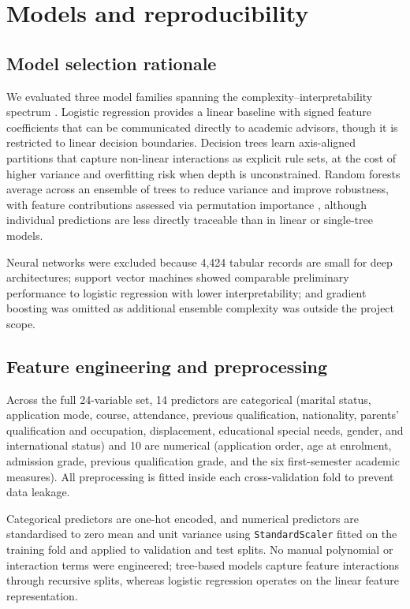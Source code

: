 \documentclass[11pt,a4paper]{article}
\begin{document}
\section{Models and reproducibility}

\subsection{Model selection rationale}

We evaluated three model families spanning the complexity--interpretability spectrum
\citep{hastie2009}. Logistic regression provides a linear baseline with signed feature coefficients
that can be communicated directly to academic advisors, though it is restricted to linear decision
boundaries. Decision trees learn axis-aligned partitions that capture non-linear interactions as
explicit rule sets, at the cost of higher variance and overfitting risk when depth is unconstrained.
Random forests \citep{breiman2001} average across an ensemble of trees to reduce variance and
improve robustness, with feature contributions assessed via permutation importance
\citep{strobl2008}, although individual predictions are less directly traceable than in linear or
single-tree models.

Neural networks were excluded because 4,424 tabular records are small for deep architectures;
support vector machines showed comparable preliminary performance to logistic regression with lower
interpretability; and gradient boosting was omitted as additional ensemble complexity was outside
the project scope.

\subsection{Feature engineering and preprocessing}

Across the full 24-variable set, 14 predictors are categorical (marital status, application mode,
course, attendance, previous qualification, nationality, parents' qualification and occupation,
displacement, educational special needs, gender, and international status) and 10 are numerical
(application order, age at enrolment, admission grade, previous qualification grade, and the six
first-semester academic measures). All preprocessing is fitted inside each cross-validation fold to
prevent data leakage.

Categorical predictors are one-hot encoded, and numerical predictors are standardised to zero mean
and unit variance using \texttt{StandardScaler} fitted on the training fold and applied to
validation and test splits. No manual polynomial or interaction terms were engineered; tree-based
models capture feature interactions through recursive splits, whereas logistic regression operates on
the linear feature representation.
\end{document}
